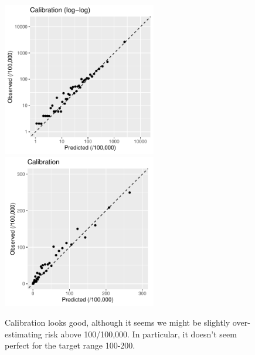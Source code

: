 \documentclass[12pt]{article}
\begin{document}
\begin{figure}[h]
\centering
\includegraphics[width=0.6\textwidth]{figures/calibration50_log.pdf}
\includegraphics[width=0.6\textwidth]{figures/calibration50_zoom.pdf}
\caption{Calibration looks good, although it seems we might be  slightly
over-estimating risk above 100/100,000. In particular, it doesn't seem
perfect for the target range 100-200.}
\end{figure}
\end{document}
